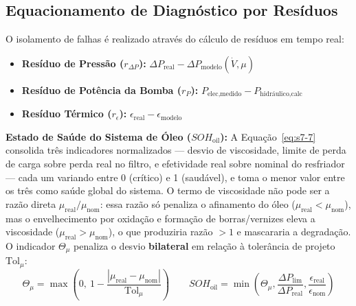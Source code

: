 \documentclass[12pt,a4paper]{article}
\numberwithin{equation}{section}
\numberwithin{table}{section}
\numberwithin{figure}{section}
\begin{document}
{	\subsection{\textbf{Equacionamento de Diagnóstico por Resíduos}}
	O isolamento de falhas é realizado através do cálculo de resíduos em tempo real:
	\begin{itemize}
		\item \textbf{Resíduo de Pressão ($r_{\Delta P}$):} $ \Delta P_{\text{real}} - \Delta P_{\text{modelo}}(\dot{V}, \mu) $
		\item \textbf{Resíduo de Potência da Bomba ($r_{P}$):} $ P_{\text{elec,medido}} - P_{\text{hidráulico,calc}} $
		\item \textbf{Resíduo Térmico ($r_{\epsilon}$):} $ \epsilon_{\text{real}} - \epsilon_{\text{modelo}} $
	\end{itemize}
	
	\vspace{1em}
	\textbf{Estado de Saúde do Sistema de Óleo ($SOH_{\text{oil}}$):} A Equação~\eqref{eq:s7-7} consolida três indicadores normalizados — desvio de viscosidade, limite de perda de carga sobre perda real no filtro, e efetividade real sobre nominal do resfriador — cada um variando entre 0 (crítico) e 1 (saudável), e toma o menor valor entre os três como saúde global do sistema. O termo de viscosidade não pode ser a razão direta $\mu_{\text{real}}/\mu_{\text{nom}}$: essa razão só penaliza o afinamento do óleo ($\mu_{\text{real}} < \mu_{\text{nom}}$), mas o envelhecimento por oxidação e formação de borras/vernizes eleva a viscosidade ($\mu_{\text{real}} > \mu_{\text{nom}}$), o que produziria razão $>1$ e mascararia a degradação. O indicador $\Theta_\mu$ penaliza o desvio \textbf{bilateral} em relação à tolerância de projeto $\text{Tol}_\mu$:
	\begin{equation}\label{eq:s7-7}
 \Theta_\mu = \max\left(0,\ 1 - \frac{|\mu_{\text{real}} - \mu_{\text{nom}}|}{\text{Tol}_\mu}\right) \qquad \boxed{SOH_{\text{oil}} = \min \left( \Theta_\mu, \frac{\Delta P_{\text{lim}}}{\Delta P_{\text{real}}}, \frac{\epsilon_{\text{real}}}{\epsilon_{\text{nom}}} \right)}
\end{equation}

}
\end{document}
